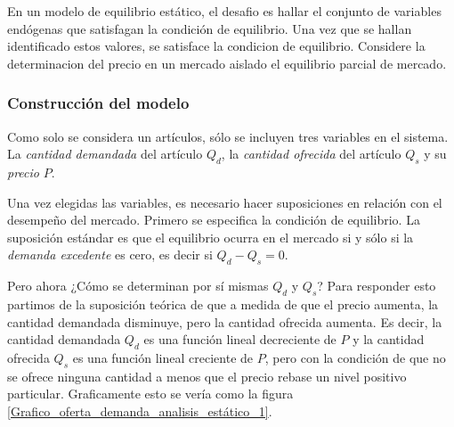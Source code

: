 En un modelo de equilibrio estático, el desafio es hallar el conjunto de variables endógenas que satisfagan la condición de equilibrio. Una vez que se hallan identificado estos valores, se satisface la condicion de equilibrio. Considere la determinacion del precio en un mercado aislado el equilibrio parcial de mercado.

\subsubsection{Construcción del modelo}

Como solo se considera un artículos, sólo se incluyen tres variables en el sistema. La \textit{cantidad demandada} del artículo \(Q_d\), la \textit{cantidad ofrecida} del artículo \(Q_s\) y su \textit{precio} \(P\).

Una vez elegidas las variables, es necesario hacer suposiciones en relación con el desempeño del mercado. Primero se especifica la condición de equilibrio. La suposición estándar es que el equilibrio ocurra en el mercado si y sólo si la \textit{demanda excedente} es cero, es decir si \(Q_d-Q_s=0\). 

Pero ahora ¿Cómo se determinan por sí mismas \(Q_d\) y \(Q_s\)? Para responder esto partimos de la suposición teórica de que a medida de que el precio aumenta, la cantidad demandada disminuye, pero la cantidad ofrecida aumenta. Es decir, la cantidad demandada \(Q_d\) es una función lineal decreciente de \(P\) y la cantidad ofrecida \(Q_s\) es una función lineal creciente de \(P\), pero con la condición de que no se ofrece ninguna cantidad a menos que el precio rebase un nivel positivo particular. Graficamente esto se vería como la figura \ref{Grafico_oferta_demanda_analisis_estático_1}.

